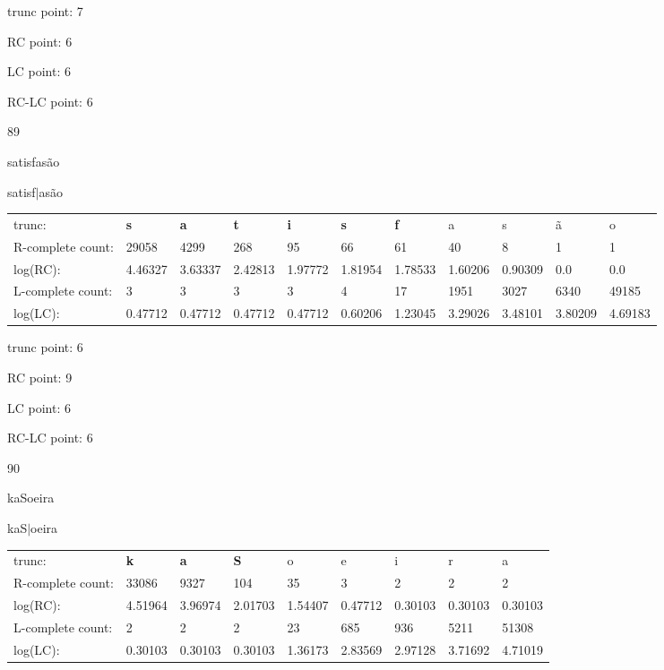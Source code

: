 \documentclass{article}
\begin{document}
trunc point: 7

RC point: 6

LC point: 6

RC-LC point: 6

\vspace{3em}



89

satisfasão

satisf$|$asão

\vspace{1em}

\begin{tabular}{l|llllllllll}

trunc: & {\color{red}\bf s} & {\color{red}\bf a} & {\color{red}\bf t} & {\color{red}\bf i} & {\color{red}\bf s} & {\color{red}\bf f} & a & s & ã & o \\ 
R-complete count: & 29058 & 4299 & 268 & 95 & 66 & 61 & 40 & 8 & 1 & 1 \\ 
log(RC): & 4.46327 & 3.63337 & 2.42813 & 1.97772 & 1.81954 & 1.78533 & 1.60206 & 0.90309 & 0.0 & 0.0 \\ 
L-complete count: & 3 & 3 & 3 & 3 & 4 & 17 & 1951 & 3027 & 6340 & 49185 \\ 
log(LC): & 0.47712 & 0.47712 & 0.47712 & 0.47712 & 0.60206 & 1.23045 & 3.29026 & 3.48101 & 3.80209 & 4.69183 \\ 
\end{tabular}

trunc point: 6

RC point: 9

LC point: 6

RC-LC point: 6

\vspace{3em}



90

kaSoeira

kaS$|$oeira

\vspace{1em}

\begin{tabular}{l|llllllll}

trunc: & {\color{red}\bf k} & {\color{red}\bf a} & {\color{red}\bf S} & o & e & i & r & a \\ 
R-complete count: & 33086 & 9327 & 104 & 35 & 3 & 2 & 2 & 2 \\ 
log(RC): & 4.51964 & 3.96974 & 2.01703 & 1.54407 & 0.47712 & 0.30103 & 0.30103 & 0.30103 \\ 
L-complete count: & 2 & 2 & 2 & 23 & 685 & 936 & 5211 & 51308 \\ 
log(LC): & 0.30103 & 0.30103 & 0.30103 & 1.36173 & 2.83569 & 2.97128 & 3.71692 & 4.71019 \\ 
\end{tabular}
\end{document}
